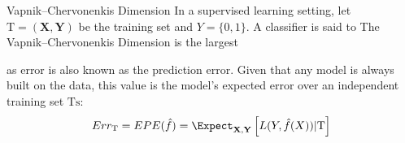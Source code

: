 \begin{definition}{Vapnik–Chervonenkis Dimension}
 	In a supervised learning setting, let  $\mathrm{T} = (\textbf{X},\textbf{Y})$ be the training set and $Y = \{0,1 \}$. A classifier is said to 
 	The Vapnik–Chervonenkis Dimension is the largest 
 	
 	as error is also known as the prediction error. Given that any model is always built on the data, this value is the model's expected error over an independent training set $\mathrm{Ts}$:
 	$$ Err_{\mathrm{T}} =  EPE(\hat{f})= \Expect_{\textbf{X},\textbf{Y}} \left[ L(Y,\hat{f}(X)) |  \mathrm{T}\right]$$
 \end{definition}
 

